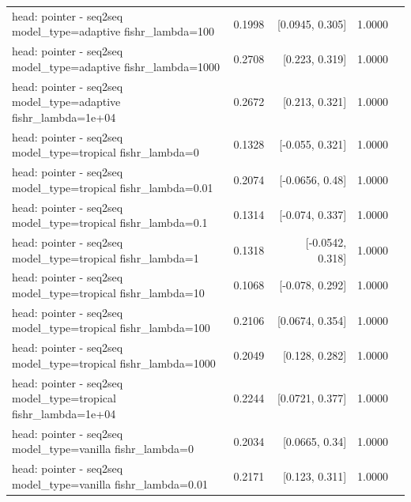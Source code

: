 \documentclass[10pt]{article}
\makeatletter
\newcommand{\stackcell}[1]{\begin{tabular}[t]{@{}l@{}}#1\end{tabular}}
\makeatother
\begin{document}
{\begin{longtable}{lrrrl}
\stackcell{head: pointer - seq2seq\\\footnotesize model\_type=adaptive fishr\_lambda=100 } & 0.1998 & [0.0945, 0.305] & 1.0000 & \\
\stackcell{head: pointer - seq2seq\\\footnotesize model\_type=adaptive fishr\_lambda=1000 } & 0.2708 & [0.223, 0.319] & 1.0000 & \\
\stackcell{head: pointer - seq2seq\\\footnotesize model\_type=adaptive fishr\_lambda=1e+04 } & 0.2672 & [0.213, 0.321] & 1.0000 & \\
\stackcell{head: pointer - seq2seq\\\footnotesize model\_type=tropical fishr\_lambda=0 } & 0.1328 & [-0.055, 0.321] & 1.0000 & \\
\stackcell{head: pointer - seq2seq\\\footnotesize model\_type=tropical fishr\_lambda=0.01 } & 0.2074 & [-0.0656, 0.48] & 1.0000 & \\
\stackcell{head: pointer - seq2seq\\\footnotesize model\_type=tropical fishr\_lambda=0.1 } & 0.1314 & [-0.074, 0.337] & 1.0000 & \\
\stackcell{head: pointer - seq2seq\\\footnotesize model\_type=tropical fishr\_lambda=1 } & 0.1318 & [-0.0542, 0.318] & 1.0000 & \\
\stackcell{head: pointer - seq2seq\\\footnotesize model\_type=tropical fishr\_lambda=10 } & 0.1068 & [-0.078, 0.292] & 1.0000 & \\
\stackcell{head: pointer - seq2seq\\\footnotesize model\_type=tropical fishr\_lambda=100 } & 0.2106 & [0.0674, 0.354] & 1.0000 & \\
\stackcell{head: pointer - seq2seq\\\footnotesize model\_type=tropical fishr\_lambda=1000 } & 0.2049 & [0.128, 0.282] & 1.0000 & \\
\stackcell{head: pointer - seq2seq\\\footnotesize model\_type=tropical fishr\_lambda=1e+04 } & 0.2244 & [0.0721, 0.377] & 1.0000 & \\
\stackcell{head: pointer - seq2seq\\\footnotesize model\_type=vanilla fishr\_lambda=0 } & 0.2034 & [0.0665, 0.34] & 1.0000 & \\
\stackcell{head: pointer - seq2seq\\\footnotesize model\_type=vanilla fishr\_lambda=0.01 } & 0.2171 & [0.123, 0.311] & 1.0000 & \\

\end{longtable}}
\end{document}
